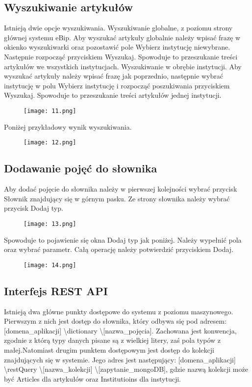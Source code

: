\documentclass{article}
\begin{document}
\subsection{Wyszukiwanie artykułów}
	Istnieją dwie opcje wyszukiwania.  
	Wyszukiwanie globalne, z poziomu strony głównej systemu eBip. Aby wyszukać artykuły globalnie należy wpisać frazę w okienko wyszukiwarki oraz pozostawić pole Wybierz instytucję niewybrane. Następnie rozpocząć przyciskiem Wyszukaj. Spowoduje to przeszukanie treści artykułów we wszystkich instytucjach.
	Wyszukiwanie w obrębie instytucji. Aby wyszukać artykuły należy wpisać frazę jak poprzednio, następnie wybrać instytucję w polu Wybierz instytucję i rozpocząć poszukiwania przyciskiem Wyszukaj. Spowoduje to przeszukanie treści artykułów jednej instytucji.

\begin{figure}[h!]
	\texttt{[image: 11.png]}
	\centering
\end{figure}

\newpage

	Poniżej przykładowy wynik wyszukiwania.

\begin{figure}[h!]
	\texttt{[image: 12.png]}
	\centering
\end{figure}	

\subsection{Dodawanie pojęć do słownika}
	Aby dodać pojęcie do słownika należy w pierwszej kolejności wybrać przycisk Słownik znajdujący się w górnym pasku. Ze strony słownika należy wybrać przycisk Dodaj typ.
\begin{figure}[h!]
	\texttt{[image: 13.png]}
	\centering
\end{figure}
	Spowoduje to pojawienie się okna Dodaj typ jak poniżej. Należy wypełnić pola oraz wybrać parametr. Całą operację należy potwierdzić przyciskiem Dodaj.
\begin{figure}[h!]
	\texttt{[image: 14.png]}
	\centering
\end{figure}
\subsection{Interfejs REST API}	
	Istnieją dwa główne punkty dostępowe do systemu z poziomu maszynowego. Pierwszym z nich jest dostęp do słownika, który odbywa się pod adresem: [domena\_aplikacji] \textbackslash dictionary \textbackslash [nazwa\_pojęcia]. Zachowana jest konwencja, zgodnie z którą typy danych pisane są z wielkiej litery, zaś pola typów z małej.Natomiast drugim punktem dostępowym jest dostęp do kolekcji znajdujących się w systemie. Jego adres jest następujący: [domena\_aplikacji] \textbackslash restQuery \textbackslash [nazwa\_kolekcji] \textbackslash [zapytanie\_mongoDB], gdzie nazwą kolekcji może być Articles dla artykułów oraz Institutioins dla instytucji.
\end{document}
